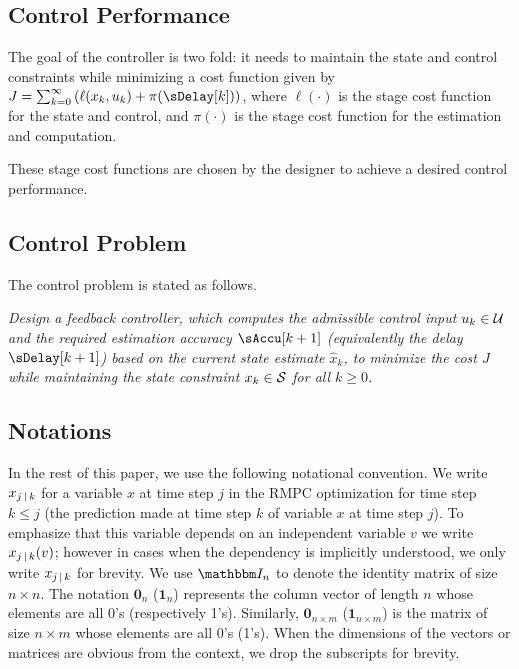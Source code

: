 \subsection{Control Performance}

The goal of the controller is two fold: it needs to maintain the state
and control constraints while minimizing a cost function given by
\(
J=\sum_{k=0}^{\infty}\left(\ell(x_{k},u_{k})+\pi(\sDelay[k])\right)
\),
where $\ell(\cdot)$ is the stage cost function for the state and
control, and $\pi(\cdot)$ is the stage cost function for the estimation
and computation.

These stage cost functions are chosen by the designer to achieve a desired control performance.


\subsection{Control Problem}

The control problem is stated as follows.
\begin{problem}\itshape
\label{prob:control-problem}Design a feedback controller, which computes
the admissible control input $u_{k}\in\mathcal{U}$ and the required estimation
accuracy $\sAccu[k+1]$ (equivalently the delay $\sDelay[k+1]$) based
on the current state estimate $\hat{x}_{k}$, to minimize the cost
$J$ while maintaining the state constraint $x_{k}\in\mathcal{S}$ for all
$k\geq 0$.
\end{problem}

\subsection{Notations}

In the rest of this paper, we use the following notational convention.
We write $x_{j\,|\, k}$ for a variable $x$ at time step $j$ in
the RMPC optimization for time step $k\leq j$ (\ie the prediction
made at time step $k$ of variable $x$ at time step $j$). To emphasize
that this variable depends on an independent variable $v$ we write
$x_{j\,|\, k}(v)$; however in cases when the dependency is implicitly
understood, we only write $x_{j\,|\, k}$ for brevity.
We use $\IdentityMatrix_{n}$ to denote the identity matrix of size
$n\times n$. The notation $\bm{0}_{n}$ ($\bm{1}_{n}$) represents
the column vector of length $n$ whose elements are all 0's (respectively
1's). Similarly, $\bm{0}_{n\times m}$ ($\bm{1}_{n\times m}$) is
the matrix of size $n\times m$ whose elements are all 0's (1's).
When the dimensions of the vectors or matrices are obvious
from the context, we drop the subscripts for brevity.

